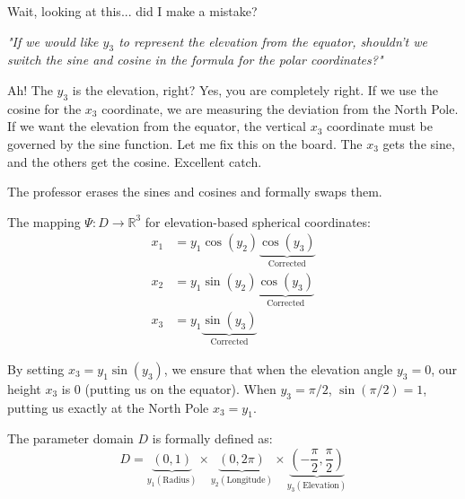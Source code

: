\begin{spoken-clean}[00:32:00 - 00:32:53]
Wait, looking at this... did I make a mistake?
\end{spoken-clean}

\begin{meta-note}
\textit{"If we would like $y_3$ to represent the elevation from the equator, shouldn't we switch the sine and cosine in the formula for the polar coordinates?"}
\end{meta-note}

\begin{spoken-clean}[continued]
Ah! The $y_3$ is the elevation, right? Yes, you are completely right. If we use the cosine for the $x_3$ coordinate, we are measuring the deviation from the North Pole. If we want the elevation from the equator, the vertical $x_3$ coordinate must be governed by the sine function. Let me fix this on the board. The $x_3$ gets the sine, and the others get the cosine. Excellent catch.
\end{spoken-clean}

\begin{nice-box}
The professor erases the sines and cosines and formally swaps them.
\end{nice-box}

\begin{math-stroke}
The mapping $\Psi: D \to \mathbb{R}^3$ for elevation-based spherical coordinates:
\begin{align} 
x_1 &= y_1 \cos(y_2) \underbrace{\cos(y_3)}_{\text{Corrected}} \nonumber \\
x_2 &= y_1 \sin(y_2) \underbrace{\cos(y_3)}_{\text{Corrected}} \label{eq:correct_spherical} \\
x_3 &= y_1 \underbrace{\sin(y_3)}_{\text{Corrected}} \nonumber
\end{align}

\begin{explanation-of-steps}
By setting $x_3 = y_1 \sin(y_3)$, we ensure that when the elevation angle $y_3 = 0$, our height $x_3$ is $0$ (putting us on the equator). When $y_3 = \pi/2$, $\sin(\pi/2) = 1$, putting us exactly at the North Pole $x_3 = y_1$.

The parameter domain $D$ is formally defined as:
\[
D = \underbrace{(0,1)}_{y_1 (\text{Radius})} \times \underbrace{(0, 2\pi)}_{y_2 (\text{Longitude})} \times \underbrace{\left(-\frac{\pi}{2}, \frac{\pi}{2}\right)}_{y_3 (\text{Elevation})}
\]
\end{explanation-of-steps}
\end{math-stroke}

